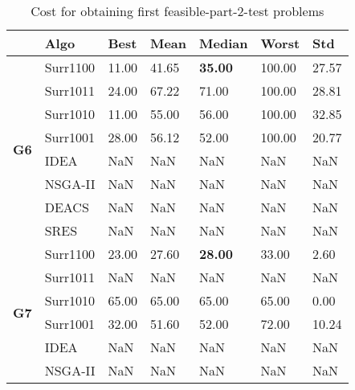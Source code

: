\begin{table*}[!htb]\scriptsize
	\caption{Cost for obtaining first feasible-part-2-test problems}
	\label{tab:firstfeascostt2}
	\centering
	\begin{tabular}{lllllll}
		\specialrule{.2em}{.1em}{.1em} 
		\multicolumn{1}{l}{\textbf{Problems}}       & \multicolumn{1}{l}{\textbf{Algo}} & \multicolumn{1}{l}{\textbf{Best}} & \multicolumn{1}{l}{\textbf{Mean}} & \multicolumn{1}{l}{\textbf{Median}} & \multicolumn{1}{l}{\textbf{Worst}} & \textbf{Std} \\ \hline
		\multirow{8}{*}{\textbf{G6}}                & Surr1100      & 11.00         & 41.65         & \textbf{35.00}  & 100.00         & 27.57        \\  
		& Surr1011      & 24.00         & 67.22         & 71.00           & 100.00         & 28.81        \\  
		& Surr1010      & 11.00         & 55.00         & 56.00           & 100.00         & 32.85        \\ 
		& Surr1001      & 28.00         & 56.12         & 52.00           & 100.00         & 20.77        \\  
		& IDEA          & NaN           & NaN           & NaN             & NaN            & NaN          \\ 
		& NSGA-II       & NaN           & NaN           & NaN             & NaN            & NaN          \\ 
		& DEACS         & NaN           & NaN           & NaN             & NaN            & NaN          \\  
		& SRES          & NaN           & NaN           & NaN             & NaN            & NaN          \\ \hline
		\multirow{8}{*}{\textbf{G7}}                & Surr1100      & 23.00         & 27.60         & \textbf{28.00}  & 33.00          & 2.60         \\  
		& Surr1011      & NaN           & NaN           & NaN             & NaN            & NaN          \\ 
		& Surr1010      & 65.00         & 65.00         & 65.00           & 65.00          & 0.00         \\
		& Surr1001      & 32.00         & 51.60         & 52.00           & 72.00          & 10.24        \\  
		& IDEA          & NaN           & NaN           & NaN             & NaN            & NaN          \\  
		& NSGA-II       & NaN           & NaN           & NaN             & NaN            & NaN          \\ 

\end{tabular}
\end{table*}
